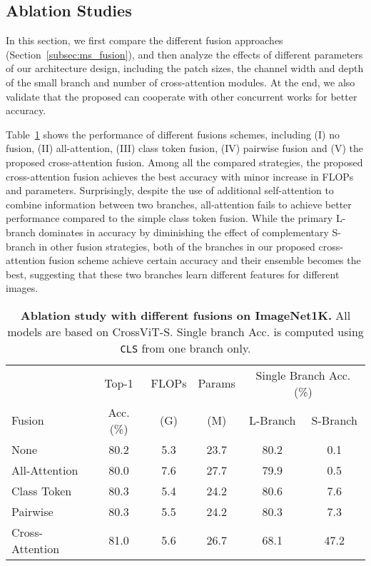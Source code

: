 \documentclass[10pt,twocolumn,letterpaper]{article}
\def\clstoken{\texttt{CLS}\xspace}
\def\ours{CrossViT\xspace}
\newcommand{\myparagraph}[1]{\vspace{1mm} \noindent {\textbf{#1}}}
\begin{document}
 \subsection{Ablation Studies}
\label{subsec:ablations}
In this section, we first compare the different fusion approaches (Section~\ref{subsec:ms_fusion}), and then analyze the effects of different parameters of our architecture design, including the patch sizes, the channel width and depth of the small branch and number of cross-attention modules. At the end, we also validate that the proposed can cooperate with other concurrent works for better accuracy.



\myparagraph{Comparison of Different Fusion Schemes.} Table~\ref{table:ablation_fusion} shows the performance of different fusions schemes, including (I) no fusion, (II) all-attention, (III) class token fusion, (IV) pairwise fusion and (V) the proposed cross-attention fusion. Among all the compared strategies, the proposed cross-attention fusion achieves the best accuracy with minor increase in FLOPs and parameters. Surprisingly, despite the use of additional self-attention to combine information between two branches, all-attention fails to achieve better performance compared to the simple class token fusion. While the primary L-branch dominates in accuracy by diminishing the effect of complementary S-branch in other fusion strategies, both of the branches in our proposed cross-attention fusion scheme achieve certain accuracy and their ensemble becomes the best, suggesting that these two branches learn different features for different images.  



\begin{table}[t]
    \centering
    \begin{adjustbox}{max width=\linewidth}
    \begin{tabular}{l|c|c|c||c|c}
        \toprule
               & Top-1 & FLOPs & Params & \multicolumn{2}{c}{Single Branch Acc. (\%) } \\ 
        Fusion & Acc. (\%)  & (G) & (M) & L-Branch & S-Branch \\
        \midrule
            None & 80.2 & 5.3 & 23.7 & 80.2 & 0.1 \\
            All-Attention & 80.0 &  7.6 & 27.7 & 79.9 & 0.5 \\
            Class Token & 80.3 & 5.4 & 24.2 & 80.6 & 7.6 \\
            Pairwise & 80.3 & 5.5 & 24.2 & 80.3 & 7.3 \\ 
            Cross-Attention & 81.0 & 5.6 & 26.7 & 68.1 & 47.2 \\
        \bottomrule
    \end{tabular}
    \end{adjustbox}
\caption{\textbf{Ablation study with different fusions on ImageNet1K.} All models are based on \ours-S. Single branch Acc. is computed using \clstoken from one branch only.}
    \label{table:ablation_fusion}
\end{table}
\end{document}
